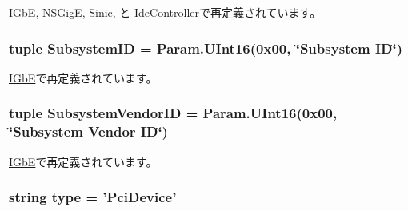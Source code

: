 \hyperlink{classEthernet_1_1IGbE_a6537e94b8ab06acd357673ec1699adc8}{IGbE}, \hyperlink{classEthernet_1_1NSGigE_a6537e94b8ab06acd357673ec1699adc8}{NSGigE}, \hyperlink{classEthernet_1_1Sinic_a6537e94b8ab06acd357673ec1699adc8}{Sinic}, と \hyperlink{classIde_1_1IdeController_a6537e94b8ab06acd357673ec1699adc8}{IdeController}で再定義されています。\hypertarget{classPci_1_1PciDevice_abb9500d6e2e6ec75e16a1410a70b0d72}{
\subsubsection[{SubsystemID}]{\setlength{\rightskip}{0pt plus 5cm}tuple {\bf SubsystemID} = Param.UInt16(0x00, \char`\"{}Subsystem ID\char`\"{})}}
\label{classPci_1_1PciDevice_abb9500d6e2e6ec75e16a1410a70b0d72}


\hyperlink{classEthernet_1_1IGbE_a4d1c38afb909fcd8a72313e8feb9b9e1}{IGbE}で再定義されています。\hypertarget{classPci_1_1PciDevice_a562a1b4e663fc1c10e0ee4e50270e43b}{
\subsubsection[{SubsystemVendorID}]{\setlength{\rightskip}{0pt plus 5cm}tuple {\bf SubsystemVendorID} = Param.UInt16(0x00, \char`\"{}Subsystem Vendor ID\char`\"{})}}
\label{classPci_1_1PciDevice_a562a1b4e663fc1c10e0ee4e50270e43b}


\hyperlink{classEthernet_1_1IGbE_a6b551917884afdfa2108dc0574bcd1e1}{IGbE}で再定義されています。\hypertarget{classPci_1_1PciDevice_acce15679d830831b0bbe8ebc2a60b2ca}{
\subsubsection[{type}]{\setlength{\rightskip}{0pt plus 5cm}string {\bf type} = '{\bf PciDevice}'}}
\label{classPci_1_1PciDevice_acce15679d830831b0bbe8ebc2a60b2ca}


